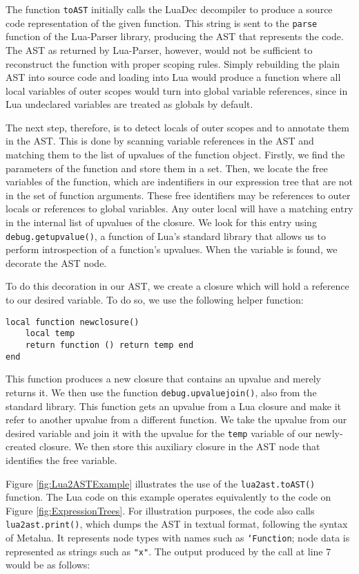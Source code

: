 \documentclass[english]{llncs}
\begin{document}
The function \texttt{toAST} initially calls the LuaDec decompiler to produce a source code representation of the given function.
This string is sent to the \texttt{parse} function of the Lua-Parser library, producing the AST that represents the code.
The AST as returned by Lua-Parser, however, would not be sufficient to reconstruct the function with proper scoping rules.
Simply rebuilding the plain AST into source code and loading into Lua would produce a function where all local variables
of outer scopes would turn into global variable references, since in Lua undeclared variables are treated as globals
by default.

The next step, therefore, is to detect locals of outer scopes and to annotate them in the AST.
This is done by scanning variable references in the AST and matching them to the list of upvalues
of the function object.
Firstly, we find the parameters of the function and store them in a set.
Then, we locate the free variables of the function, which are indentifiers in our expression tree that are not in the set of function arguments.
These free identifiers may be references to outer locals or references to global variables.
Any outer local will have a matching entry in the internal list of upvalues of the closure.
We look for this entry using \texttt{debug.getupvalue()}, a function of Lua's standard library
that allows us to perform introspection of a function's upvalues.
When the variable is found, we decorate the AST node.

To do this decoration in our AST, we create a closure which will hold a reference
to our desired variable.
To do so, we use the following helper function:

\begin{verbatim}
local function newclosure()
    local temp
    return function () return temp end
end
\end{verbatim}

This function produces a new closure that contains an upvalue and merely returns it.
We then use the function \texttt{debug.upvaluejoin()}, also from the standard library.
This function gets an upvalue from a Lua closure and make it refer to another upvalue
from a different function.
We take the upvalue from our desired variable and join it with the upvalue for the \texttt{temp} variable of our newly-created closure.
We then store this auxiliary closure in the AST node that identifies the free variable.

Figure \ref{fig:Lua2ASTExample} illustrates the use of the \texttt{lua2ast.toAST()} function.
The Lua code on this example operates equivalently to the code on Figure \ref{fig:ExpressionTrees}.
For illustration purposes, the code also calls \texttt{lua2ast.print()}, which dumps the AST in textual format,
following the syntax of Metalua. It represents node types with names such as \texttt{`Function}; node data is represented as strings such as \texttt{"x"}.
The output produced by the call at line 7 would be as follows:
\end{document}

